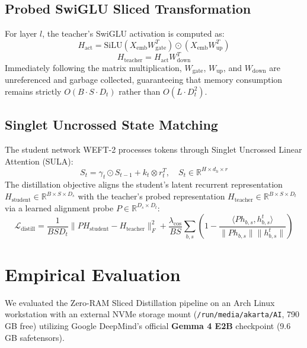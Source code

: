 \documentclass[11pt,a4paper]{article}
\begin{document}
\subsection{Probed SwiGLU Sliced Transformation}
For layer $l$, the teacher's SwiGLU activation is computed as:
\begin{equation}
H_{\text{act}} = \text{SiLU}(X_{\text{emb}} W_{\text{gate}}^T) \odot (X_{\text{emb}} W_{\text{up}}^T)
\end{equation}
\begin{equation}
H_{\text{teacher}} = H_{\text{act}} W_{\text{down}}^T
\end{equation}
Immediately following the matrix multiplication, $W_{\text{gate}}$, $W_{\text{up}}$, and $W_{\text{down}}$ are unreferenced and garbage collected, guaranteeing that memory consumption remains strictly $O(B \cdot S \cdot D_t)$ rather than $O(L \cdot D_t^2)$.

\subsection{Singlet Uncrossed State Matching}
The student network WEFT-2 processes tokens through Singlet Uncrossed Linear Attention (SULA):
\begin{equation}
S_t = \gamma_t \odot S_{t-1} + k_t \otimes r_t^T, \quad S_t \in \mathbb{R}^{H \times d_h \times r}
\end{equation}
The distillation objective aligns the student's latent recurrent representation $H_{\text{student}} \in \mathbb{R}^{B \times S \times D_s}$ with the teacher's probed representation $H_{\text{teacher}} \in \mathbb{R}^{B \times S \times D_t}$ via a learned alignment probe $P \in \mathbb{R}^{D_s \times D_t}$:
\begin{equation}
\mathcal{L}_{\text{distill}} = \frac{1}{B S D_t} \| P H_{\text{student}} - H_{\text{teacher}} \|_F^2 + \frac{\lambda_{\text{cos}}}{B S} \sum_{b, s} \left(1 - \frac{\langle P h_{b,s}, h_{b,s}^t \rangle}{\|P h_{b,s}\| \|h_{b,s}^t\|}\right)
\end{equation}

\section{Empirical Evaluation}
We evaluated the Zero-RAM Sliced Distillation pipeline on an Arch Linux workstation with an external NVMe storage mount (\texttt{/run/media/akarta/AI}, 790 GB free) utilizing Google DeepMind's official \textbf{Gemma 4 E2B} checkpoint (9.6 GB safetensors).
\end{document}
